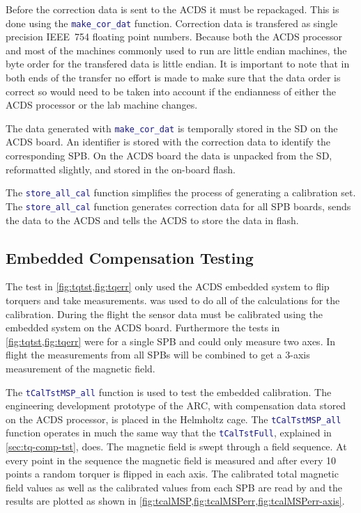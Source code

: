 Before the correction data is sent to the \ac{ACDS} it must be repackaged. This is done using the \lstinline[style=code,language=Matlab]$make_cor_dat$ function. Correction data is transfered as single precision IEEE~754 floating point numbers. Because both the \ac{ACDS} processor and most of the machines commonly used to run \matlab are little endian machines, the byte order for the transfered data is little endian. It is important to note that in both ends of the transfer no effort is made to make sure that the data order is correct so would need to be taken into account if the endianness of either the \ac{ACDS} processor or the lab machine changes.

The data generated with \lstinline[style=code,language=Matlab]$make_cor_dat$ is temporally stored in the \ac{SD} on the \ac{ACDS} board. An identifier is stored with the correction data to identify the corresponding \ac{SPB}. On the \ac{ACDS} board the data is unpacked from the \ac{SD}, reformatted slightly, and stored in the on-board flash. 

The \lstinline[style=code,language=Matlab]$store_all_cal$ function simplifies the process of generating a calibration set. The \lstinline[style=code,language=Matlab]$store_all_cal$ function generates correction data for all \ac{SPB} boards, sends the data to the \ac{ACDS} and tells the \ac{ACDS} to store the data in flash. 

\subsection{Embedded Compensation Testing}

The test in \cref{fig:tqtst,fig:tqerr} only used the \ac{ACDS} embedded system to flip torquers and take measurements. \matlab was used to do all of the calculations for the calibration. During the flight the sensor data must be calibrated using the embedded system on the \ac{ACDS} board. Furthermore the tests in \cref{fig:tqtst,fig:tqerr} were for a single \ac{SPB} and could only measure two axes. In flight the measurements from all \acp{SPB} will be combined to get a 3-axis measurement of the magnetic field.

The \lstinline[style=code,language=Matlab]$tCalTstMSP_all$ function is used to test the embedded calibration. The engineering development prototype of the \ac{ARC}, with compensation data stored on the \ac{ACDS} processor, is placed in the Helmholtz cage. The \lstinline[style=code,language=Matlab]$tCalTstMSP_all$ function operates in much the same way that the \lstinline[style=code,language=Matlab]$tCalTstFull$, explained in \cref{sec:tq-comp-tst}, does. The magnetic field is swept through a field sequence. At every point in the sequence the magnetic field is measured and after every 10 points a random torquer is flipped in each axis. The calibrated total magnetic field values as well as the calibrated values from each \ac{SPB} are read by \matlab and the results are plotted as shown in \cref{fig:tcalMSP,fig:tcalMSPerr,fig:tcalMSPerr-axis}.

